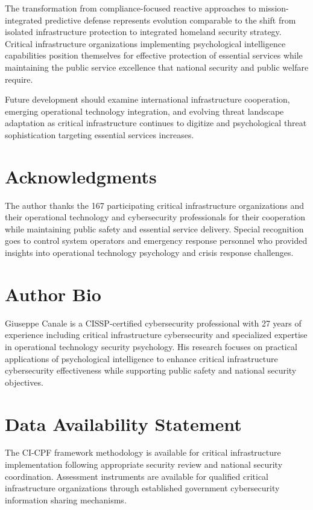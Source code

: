 \documentclass[10pt, twocolumn]{article}
\begin{document}
The transformation from compliance-focused reactive approaches to mission-integrated predictive defense represents evolution comparable to the shift from isolated infrastructure protection to integrated homeland security strategy. Critical infrastructure organizations implementing psychological intelligence capabilities position themselves for effective protection of essential services while maintaining the public service excellence that national security and public welfare require.

Future development should examine international infrastructure cooperation, emerging operational technology integration, and evolving threat landscape adaptation as critical infrastructure continues to digitize and psychological threat sophistication targeting essential services increases.

\section*{Acknowledgments}

The author thanks the 167 participating critical infrastructure organizations and their operational technology and cybersecurity professionals for their cooperation while maintaining public safety and essential service delivery. Special recognition goes to control system operators and emergency response personnel who provided insights into operational technology psychology and crisis response challenges.

\section*{Author Bio}

Giuseppe Canale is a CISSP-certified cybersecurity professional with 27 years of experience including critical infrastructure cybersecurity and specialized expertise in operational technology security psychology. His research focuses on practical applications of psychological intelligence to enhance critical infrastructure cybersecurity effectiveness while supporting public safety and national security objectives.

\section*{Data Availability Statement}

The CI-CPF framework methodology is available for critical infrastructure implementation following appropriate security review and national security coordination. Assessment instruments are available for qualified critical infrastructure organizations through established government cybersecurity information sharing mechanisms.
\end{document}
